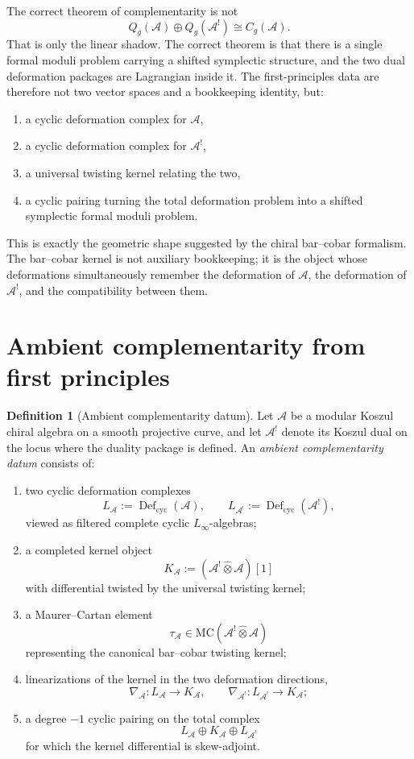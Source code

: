 \documentclass[11pt,oneside]{memoir}
\numberwithin{equation}{chapter}
\theoremstyle{definition}
\newtheorem{definition}[theorem]{Definition}
\newcommand{\cA}{\mathcal A}
\newcommand{\Defcyc}{\operatorname{Def}_{\mathrm{cyc}}}
\begin{document}
The correct theorem of complementarity is not
\[
Q_g(\cA)\oplus Q_g(\cA^!) \cong C_g(\cA).
\]
That is only the linear shadow.  The correct theorem is that there is a single formal moduli problem carrying a shifted symplectic structure, and the two dual deformation packages are Lagrangian inside it.  The first-principles data are therefore not two vector spaces and a bookkeeping identity, but:
\begin{enumerate}[label=\textup{(\arabic*)}]
\item a cyclic deformation complex for $\cA$,
\item a cyclic deformation complex for $\cA^!$,
\item a universal twisting kernel relating the two,
\item a cyclic pairing turning the total deformation problem into a shifted symplectic formal moduli problem.
\end{enumerate}

This is exactly the geometric shape suggested by the chiral bar--cobar formalism.  The bar--cobar kernel is not auxiliary bookkeeping; it is the object whose deformations simultaneously remember the deformation of $\cA$, the deformation of $\cA^!$, and the compatibility between them.

\section{Ambient complementarity from first principles}
\label{sec:nms-ambient-complementarity}

\begin{definition}[Ambient complementarity datum]
\label{def:nms-ambient-datum}
Let $\cA$ be a modular Koszul chiral algebra on a smooth projective curve, and let $\cA^!$ denote its Koszul dual on the locus where the duality package is defined.  An \emph{ambient complementarity datum} consists of:
\begin{enumerate}[label=\textup{(\roman*)}]
\item two cyclic deformation complexes
\[
L_{\cA}:=\Defcyc(\cA),\qquad L_{\cA^!}:=\Defcyc(\cA^!),
\]
viewed as filtered complete cyclic $L_\infty$-algebras;
\item a completed kernel object
\[
K_{\cA}:=(\cA^!\widehat\otimes \cA)[1]
\]
with differential twisted by the universal twisting kernel;
\item a Maurer--Cartan element
\[
\tau_{\cA}\in \mathrm{MC}(\cA^!\widehat\otimes \cA)
\]
representing the canonical bar--cobar twisting kernel;
\item linearizations of the kernel in the two deformation directions,
\[
\nabla_{\cA}:L_{\cA}\to K_{\cA},
\qquad
\nabla_{\cA^!}:L_{\cA^!}\to K_{\cA};
\]
\item a degree $-1$ cyclic pairing on the total complex
\[
L_{\cA}\oplus K_{\cA}\oplus L_{\cA^!}
\]
for which the kernel differential is skew-adjoint.
\end{enumerate}
\end{definition}
\end{document}
